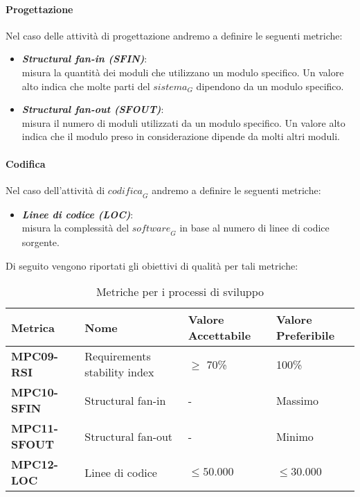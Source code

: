 \paragraph{Progettazione}
Nel caso delle attività di progettazione andremo a definire le seguenti metriche:
\begin{itemize}
    \item \textbf{\emph{Structural fan-in (SFIN)}}:\\
    misura la quantità dei moduli che utilizzano un modulo specifico. Un valore alto indica che molte parti del $\textit{sistema}_G$ dipendono da un modulo specifico.
    \item \textbf{\emph{Structural fan-out (SFOUT)}}:\\
    misura il numero di moduli utilizzati da un modulo specifico. Un valore alto indica che il modulo preso in considerazione dipende da molti altri moduli.
\end{itemize}

\paragraph{Codifica}
Nel caso dell'attività di $\textit{codifica}_G$ andremo a definire le seguenti metriche:
\begin{itemize}
    \item \textbf{\emph{Linee di codice (LOC)}}:\\
    misura la complessità del $\textit{software}_G$ in base al numero di linee di codice sorgente.\\  
\end{itemize}
\newpage
Di seguito vengono riportati gli obiettivi di qualità per tali metriche:
\begin{table}[htbp]
    \centering
    \begin{tabular}{|>{\centering\arraybackslash}p{3.5cm}|p{4.3cm}|p{4cm}|p{4cm}|}
    \hline
    \rowcolor{gray!30}
    \textbf{Metrica} & \textbf{Nome} & \textbf{Valore Accettabile} & \textbf{Valore Preferibile} \\
    \hline
    \rowcolor{gray!10}
    \textbf{MPC09-RSI} & Requirements stability index & $\geq$ 70\% & 100\% \\
    \hline
    \rowcolor{gray!10}
    \textbf{MPC10-SFIN} & Structural fan-in & - & Massimo \\
    \hline
    \rowcolor{gray!10}
    \textbf{MPC11-SFOUT} & Structural fan-out & - & Minimo \\
    \hline
    \rowcolor{gray!10}
    \textbf{MPC12-LOC} & Linee di codice & $\leq 50.000 $ & $\leq 30.000$ \\
    \hline
    \end{tabular}
    \caption{Metriche per i processi di sviluppo}
    \label{tab:metriche_sviluppo}
\end{table}



